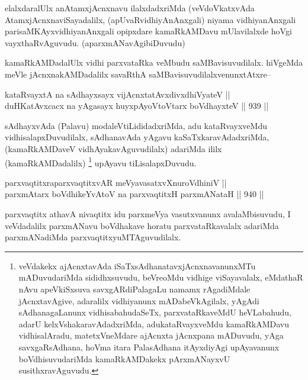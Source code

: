 \begin{artha}
elalxdaralUlx anAtamxjAcnxnavu ilalxdadxriMda (veVdoVkatxvAda AtamxjAcnxnaviSayadalilx, (apUvaRvidhiyAnAnxgali) niyama vidhiyanAnxgali parisaMKAyxvidhiyanAnxgali opipxdare kamaRkAMDavu mUlavilalxde hoVgi vayxthaRvAguvudu. (aparxmANavAgibiDuvudu)
\end{artha}

\begin{artha}
kamaRkAMDadalUlx vidhi parxvataRka veMbudu saMBavisuvudilalx. hiVgeMda meVle jAcnxnakAMDadalilx savaRthA saMBavisuvudilalxvenunxtAtxre--
\end{artha}

\begin{shl}
kataRvayxtA na sAdhayxsayx vijAcnxtatAvxdivxdhiVyateV || \\
duHKatAvxcacx na yAgasayx huyxpAyoV\s toV\s tarx boVdhayxteV ||  939 ||  
\end{shl}

\begin{artha}
sAdhayxvAda (Palavu) modaleVtiLididadxriMda, adu kataRvayxveMdu vidhisalapxDuvudilalx, sAdhanavAda yAgavu kaSaTxkaravAdadxriMda,(kamaRkAMDaveV vidhAyakavAguvudilalx) adariMda ililx (kamaRkAMDadalilx) \footnote{veVdakekx ajAcnxtavAda iSaTxsAdhanatavxjAcnxnavanunxMTu mADuvudariMda sididhxsuvudu, beVreoMdu vidhige viSayavalalx, eMdathaR nAvu apeVkiSxsuva savxgARdiPalagaLu namamx rAgadiMdale jAcnxtavAgive, adaralilx vidhiyanunx mADabeVkAgilalx, yAgAdi sAdhanagaLanunx vidhisabahudaSeTx, parxvataRkaveMdU heVLabahudu, adarU kelxVshakaravAdadxriMda, adukataRvayxveMdu kamaRkAMDavu vidhisalAradu, matetxVneMdare ajAcnxta jAcnxpana mADuvudu, yAga savxgaRsAdhana, hoVma itara PalasAdhana itAyxdiyAgi upAyavanunx boVdhisuvudariMda kamaRkAMDakekx pArxmANayxvU susithxravAguvudu.} upAyavu tiLisalapxDuvudu.
\end{artha}


\begin{shl}
parxvaqtitxraparxvaqtitxvAR meVyavasatxvXnuroVdhiniV || \\
parxmA\s tarx boVdhikeYvAtoV na parxvaqtitxH parxmANataH ||  940 ||  
\end{shl}

\begin{artha}
parxvaqtitx athavA nivaqtitx idu parxmeVya vasutxvanunx avalaMbisuvudu, I veVdadalilx parxmANavu boVdhakave horatu parxvataRkavalalx adariMda parxmANadiMda parxvaqtitxyuMTAguvudilalx.
\end{artha}

